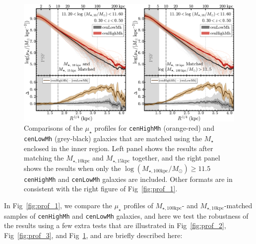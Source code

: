 \documentclass[a4paper,fleqn,usenatbib]{mnras}
\def\rbcg{\texttt{cenHighMh}}
\def\nbcg{\texttt{cenLowMh}}
\def\mstar{{$M_{\star}$}}
\def\minn{{$M_{\star,10\mathrm{kpc}}$}}
\def\meff{{$M_{\star,15\mathrm{kpc}}$}}
\def\mtot{{$M_{\star,100\mathrm{kpc}}$}}
\def\logmtot{{$\log (M_{\star,100\mathrm{kpc}}/M_{\odot})$}}
\def\mden{{$\mu_{\star}$}}
\begin{document}
  \begin{figure}
      \centering 
      \includegraphics[width=15.5cm]{fig/redbcg_prof_4}
      \caption{
          Comparisons of the \mden{} profiles for \rbcg{} (orange-red) and \nbcg{} 
          (grey-black) galaxies that are matched using the \mstar{} enclosed in the 
          inner region. 
          Left panel shows the results after matching the \minn{} and \meff{} together, 
          and the right panel shows the results when only the \logmtot{}$\ge 11.5$
          \rbcg{} and \nbcg{} galaxies are included.
          Other formats are in consistent with the right figure of Fig~\ref{fig:prof_1}.
          }
      \label{fig:prof_4} 
  \end{figure}

    In Fig~\ref{fig:prof_1}, we compare the \mden{} profiles of \mtot{}- and 
    \minn{}-matched samples of \rbcg{} and \nbcg{} galaxies, and here we test the 
    robustness of the results using a few extra tests that are illustrated in
    Fig~\ref{fig:prof_2}, Fig~\ref{fig:prof_3}, and Fig~\ref{fig:prof_4}, and 
    are briefly described here:   
    
\end{document}
